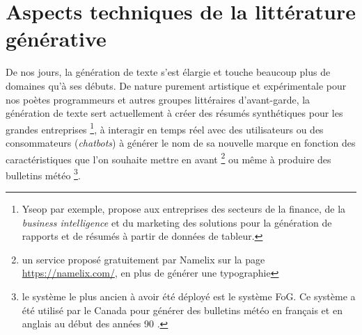 \documentclass{article}
\begin{document}
	\section{Aspects techniques de la littérature générative}\label{aspects_tech}
		De nos jours, la génération de texte s'est élargie et touche beaucoup plus de domaines qu'à ses débuts. De nature purement artistique et expérimentale pour nos poètes programmeurs et autres groupes littéraires d'avant-garde, la génération de texte sert actuellement à créer des résumés synthétiques pour les grandes entreprises \footnote{Yseop par exemple, propose aux entreprises des secteurs de la finance, de la \textit{business intelligence} et du marketing des solutions pour la génération de rapports et de résumés à partir de données de tableur.}, à interagir en temps réel avec des utilisateurs ou des consommateurs (\textit{chatbots}) à générer le nom de sa nouvelle marque en fonction des caractéristiques que l'on souhaite  mettre en avant \footnote{un service proposé gratuitement par Namelix sur la page \href{https://namelix.com/}{https://namelix.com/}, en plus de générer une typographie} ou même à produire des bulletins météo \footnote{le système le plus ancien à avoir été déployé est le système FoG. Ce système a été utilisé par le Canada pour générer des bulletins météo en français et en anglais au début des années 90 \cite{wiki:fog}.}.\\
		
\end{document}
